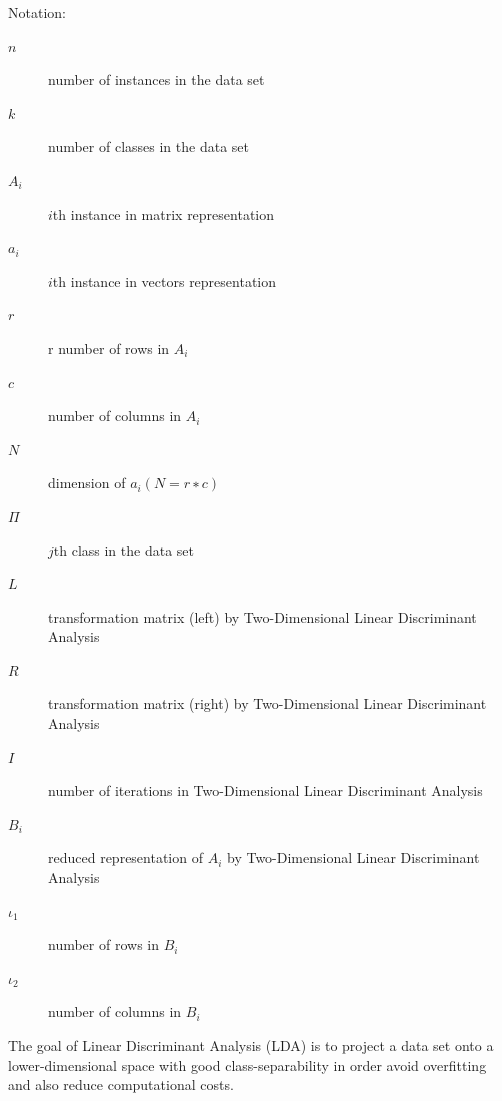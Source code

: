 \begin{enumerate}
    Notation:
    \begin{description}
        \item [$n$] number of instances in the data set
        \item [$k$] number of classes in the data set
        \item [$A_{i}$] $i$th instance in matrix representation
        \item [$a_{i}$] $i$th instance in vectors representation
        \item [$r$] r number of rows in $A_{i}$
        \item [$c$] number of columns in $A_{i}$
        \item [$N$] dimension of $a_{i} (N = r ∗ c)$
        \item [$\Pi$] $j$th class in the data set
        \item [$L$] transformation matrix (left) by Two-Dimensional Linear Discriminant Analysis
        \item [$R$] transformation matrix (right) by Two-Dimensional Linear Discriminant Analysis
        \item [$I$] number of iterations in Two-Dimensional Linear Discriminant Analysis
        \item [$B_{i}$] reduced representation of $A_{i}$ by Two-Dimensional Linear Discriminant Analysis
        \item [$\iota_{1}$] number of rows in $B_{i}$
        \item [$\iota_{2}$] number of columns in $B_{i}$
    \end{description}
    
    
    The goal of Linear Discriminant Analysis (LDA) is to project a data set onto a lower-dimensional space with good class-separability in order avoid overfitting and also reduce computational costs.
    

\end{enumerate}
